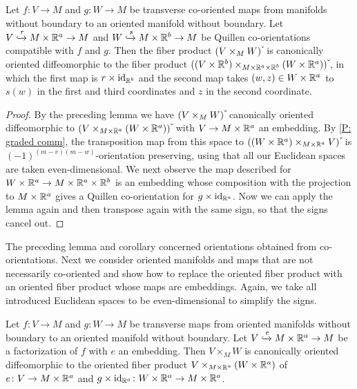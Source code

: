 \begin{corollary}\label{C: co-oriented full transition to embedded}
	Let $f \colon V \to M$ and $g \colon W \to M$ be transverse co-oriented maps from manifolds without boundary to an oriented manifold without boundary.
	Let $V \xhookrightarrow{r} M \times \mathbb{R}^a \to M$ and $W\xhookrightarrow{s} M \times \mathbb{R}^b \to M$ be Quillen co-orientations compatible with $f$ and $g$.
	Then the fiber product $(V \times_M W)\,\check{\vrule height1.3ex width0pt}$ is canonically oriented diffeomorphic to the fiber product $((V \times \R^b ) \times_{M \times \R^a \times \R^b }(W \times \R^a))\,\check{\vrule height1.3ex width0pt}$, in which the first map is $r \times \mathrm{id}_{\mathbb{R}^b }$ and the second map takes $(w,z) \in W \times \mathbb{R}^a $ to $s(w)$ in the first and third coordinates and $z$ in the second coordinate.
\end{corollary}

\begin{proof}
	By the preceding lemma we have $(V \times_M W)\,\check{\vrule height1.3ex width0pt}$ canonically oriented diffeomorphic to $(V\times_{M \times \R^a}(W \times \R^a))\,\check{\vrule height1.3ex width0pt}$ with $V \to M \times \mathbb{R}^a $ an embedding.
	By \cref{P: graded comm}, the transposition map from this space to $((W \times \R^a ) \times_{M \times \R^a }V)\,\check{\vrule height1.3ex width0pt}$ is $(-1)^{(m-v)(m-w)}$-orientation preserving, using that all our Euclidean spaces are taken even-dimensional.
	We next observe the map described for $W \times \mathbb{R}^a \to M \times \mathbb{R}^a \times \mathbb{R}^b $ is an embedding whose composition with the projection to $M \times \mathbb{R}^a $ gives a Quillen co-orientation for $g \times \mathrm{id}_{\mathbb{R}^a }$.
	Now we can apply the lemma again and then transpose again with the same sign, so that the signs cancel out.
\end{proof}

The preceding lemma and corollary concerned orientations obtained from co-orientations.
Next we consider oriented manifolds and maps that are not necessarily co-oriented and show how to replace the oriented fiber product with an oriented fiber product whose maps are embeddings.
Again, we take all introduced Euclidean spaces to be even-dimensional to simplify the signs.

\begin{lemma}
	Let $f \colon V \to M$ and $g \colon W \to M$ be transverse maps from oriented manifolds without boundary to an oriented manifold without boundary.
	Let $V \xhookrightarrow{e}M \times \mathbb{R}^a \to M$ be a factorization of $f$ with $e$ an embedding.
	Then $V \times_M W$ is canonically oriented diffeomorphic to the oriented fiber product $V\times_{M \times \mathbb{R}^a } (W \times \mathbb{R}^a )$ of $e \colon V \to M \times \mathbb{R}^a $ and $g \times \mathrm{id}_{\mathbb{R}^a } \colon W \times \mathbb{R}^a \to M \times \mathbb{R}^a $.
\end{lemma}

